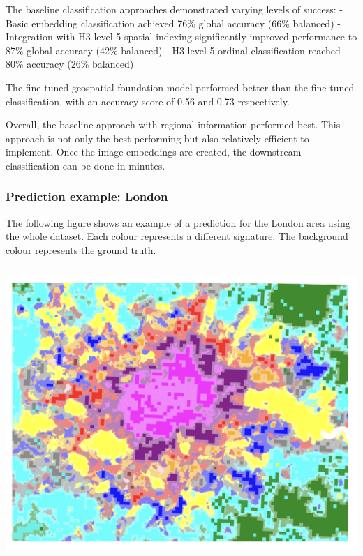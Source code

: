 \documentclass[
  letterpaper,
  DIV=11,
  numbers=noendperiod]{scrartcl}
\begin{document}
The baseline classification approaches demonstrated varying levels of
success: - Basic embedding classification achieved 76\% global accuracy
(66\% balanced) - Integration with H3 level 5 spatial indexing
significantly improved performance to 87\% global accuracy (42\%
balanced) - H3 level 5 ordinal classification reached 80\% accuracy
(26\% balanced)

The fine-tuned geospatial foundation model performed better than the
fine-tuned classification, with an accuracy score of 0.56 and 0.73
respectively.

Overall, the baseline approach with regional information performed best.
This approach is not only the best performing but also relatively
efficient to implement. Once the image embeddings are created, the
downstream classification can be done in minutes.

\subsubsection{Prediction example:
London}\label{prediction-example-london}

The following figure shows an example of a prediction for the London
area using the whole dataset. Each colour represents a different
signature. The background colour represents the ground truth.

\begin{center}
\includegraphics[width=\textwidth,height=4.375in]{../figures/algo_design/results_eurofab.png}
\end{center}
\end{document}
